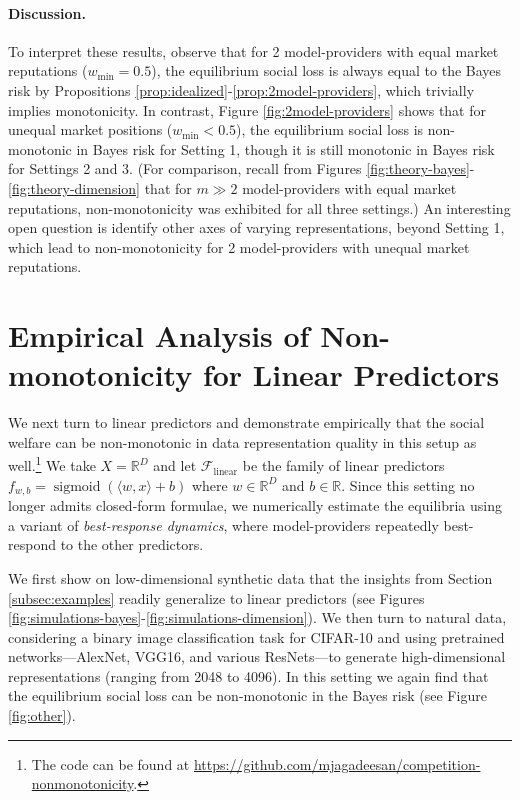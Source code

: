 \documentclass[letterpaper,11pt]{article}
\theoremstyle{plain}
\DeclareMathOperator*{\sigmoid}{sigmoid}
\begin{document}
\paragraph{Discussion.} To interpret these results, observe that for 2 model-providers with equal market reputations ($w_{\text{min}} = 0.5$), the equilibrium social loss is always equal to the Bayes risk by Propositions \ref{prop:idealized}-\ref{prop:2model-providers}, which trivially implies monotonicity. In contrast, Figure \ref{fig:2model-providers} shows that for unequal market positions ($w_{\text{min}} < 0.5$), the equilibrium social loss is non-monotonic in Bayes risk for Setting 1, though it is still monotonic in Bayes risk for Settings 2 and 3. (For comparison, recall from Figures \ref{fig:theory-bayes}-\ref{fig:theory-dimension} that for $m \gg 2$ model-providers with equal market reputations, non-monotonicity was exhibited for all three settings.) An interesting open question is identify other axes of varying representations, beyond Setting 1, which lead to non-monotonicity for 2 model-providers with unequal market reputations. 





\section{Empirical Analysis of Non-monotonicity for Linear Predictors }\label{sec:linear}


We next turn to linear predictors and demonstrate empirically that the social welfare can be non-monotonic in data representation quality in this setup as well.\footnote{The code can be found at \url{https://github.com/mjagadeesan/competition-nonmonotonicity}.} We take $X = \mathbb{R}^D$ and let $\mathcal{F}_{\text{linear}}$ be the family of linear predictors $f_{w,b} = \sigmoid(\langle w, x \rangle + b)$ where $w \in \mathbb{R}^D$ and $b \in \mathbb{R}$.  Since this setting no longer admits closed-form formulae, we numerically estimate the equilibria using a variant of \textit{best-response dynamics}, where model-providers repeatedly best-respond to the other predictors. 

We first show on low-dimensional synthetic data that the insights from Section \ref{subsec:examples} readily generalize to linear predictors (see Figures \ref{fig:simulations-bayes}-\ref{fig:simulations-dimension}). We then turn to natural data, considering a binary image classification task for CIFAR-10 and using pretrained networks---AlexNet, VGG16, and various ResNets---to generate high-dimensional representations (ranging from 2048 to 4096). In this setting we again find that the equilibrium social loss can be non-monotonic in the Bayes risk (see Figure \ref{fig:other}). 
\end{document}

